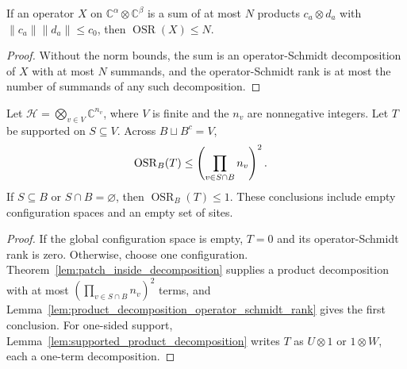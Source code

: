 \begin{lemma}
    \label{lem:product_decomposition_operator_schmidt_rank}
    \leanok
    If an operator $X$ on $\mathbb C^\alpha\otimes\mathbb C^\beta$ is a sum of at
    most $N$ products $c_a\otimes d_a$ with $\lVert c_a\rVert\lVert d_a\rVert\le c_0$,
    then $\operatorname{OSR}(X)\le N$.
\end{lemma}
\begin{proof}\leanok
    Without the norm bounds, the sum is an operator-Schmidt decomposition of
    $X$ with at most $N$ summands, and the operator-Schmidt rank is at most
    the number of summands of any such decomposition.
\end{proof}

\begin{theorem}
    \label{thm:supported_operator_schmidt_rank}
    \leanok
    Let $\mathcal H=\bigotimes_{v\in V}\mathbb C^{n_v}$, where $V$ is finite
    and the $n_v$ are nonnegative integers. Let $T$ be supported on $S\subseteq V$.
    Across $B\sqcup B^c=V$,
    \begin{align}
        \operatorname{OSR}_B(T)
         & \le\left(\prod_{v\in S\cap B}n_v\right)^2.\notag
    \end{align}
    If $S\subseteq B$ or $S\cap B=\varnothing$, then
    $\operatorname{OSR}_B(T)\le1$.
    These conclusions include empty configuration spaces and an empty set
    of sites.
\end{theorem}
\begin{proof}\leanok
    If the global configuration space is empty, $T=0$ and its
    operator-Schmidt rank is zero. Otherwise, choose one configuration.
    Theorem~\ref{lem:patch_inside_decomposition} supplies a product
    decomposition with at most $(\prod_{v\in S\cap B}n_v)^2$ terms, and
    Lemma~\ref{lem:product_decomposition_operator_schmidt_rank} gives the
    first conclusion. For one-sided support,
    Lemma~\ref{lem:supported_product_decomposition} writes $T$ as
    $U\otimes1$ or $1\otimes W$, each a one-term decomposition.
\end{proof}

